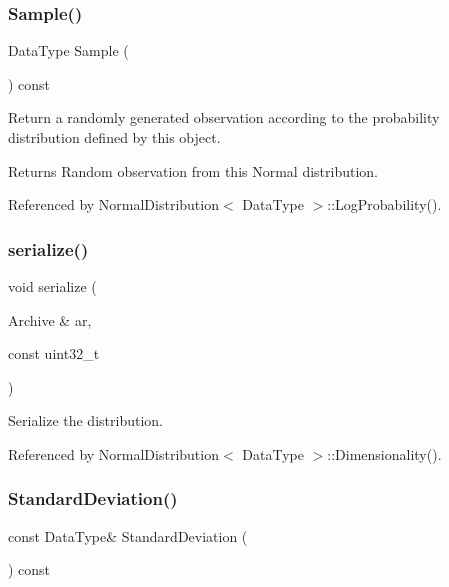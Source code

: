 \subsubsection{Sample()}
{\footnotesize\ttfamily Data\+Type Sample (\begin{DoxyParamCaption}{ }\end{DoxyParamCaption}) const}



Return a randomly generated observation according to the probability distribution defined by this object. 

\begin{DoxyReturn}{Returns}
Random observation from this Normal distribution. 
\end{DoxyReturn}


Referenced by Normal\+Distribution$<$ Data\+Type $>$\+::\+Log\+Probability().

\mbox{\label{classmlpack_1_1ann_1_1NormalDistribution_a65cba07328997659bec80b9879b15a51}} 
\subsubsection{serialize()}
{\footnotesize\ttfamily void serialize (\begin{DoxyParamCaption}\item[{Archive \&}]{ar,  }\item[{const uint32\+\_\+t}]{ }\end{DoxyParamCaption})}



Serialize the distribution. 



Referenced by Normal\+Distribution$<$ Data\+Type $>$\+::\+Dimensionality().

\mbox{\label{classmlpack_1_1ann_1_1NormalDistribution_aa16e7499e9ec471a276dfcad209c4262}} 
\subsubsection{Standard\+Deviation()\hspace{0.1cm}{\footnotesize\ttfamily [1/2]}}
{\footnotesize\ttfamily const Data\+Type\& Standard\+Deviation (\begin{DoxyParamCaption}{ }\end{DoxyParamCaption}) const\hspace{0.3cm}{\ttfamily [inline]}}



